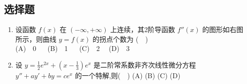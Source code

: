 \subsection{选择题}
\begin{enumerate}($\quad$)
\item 设函数 $f(x)$ 在 $(-\infty,+\infty)$ 上连续，其2阶导函数 $f''(x)$  的图形如右图所示，则曲线 $y=f(x)$ 的拐点个数为 ($\quad$)\\
(A)$\quad$0  $\quad$  (B)$\quad$1 $\quad$  (C)$\quad$2  $\quad$(D)$\quad$3 
\item 设 $y=\frac{1}{2}e^{2x}+(x-\frac{1}{3})e^x$ 是二阶常系数非齐次线性微分方程 $y''+ay'+by=ce^x$  的一个特解,则($\quad$)
(A)
(B)
(C)
(D)
\end{enumerate}